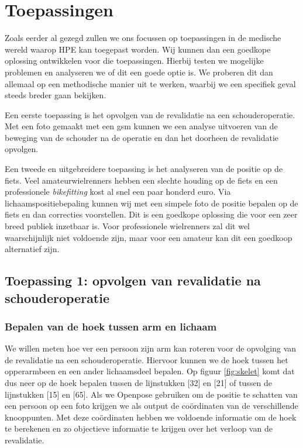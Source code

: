 \documentclass[a4paper,twoside,kulak]{kulakreport}
\begin{document}
\chapter{Toepassingen}
Zoals eerder al gezegd zullen we ons focussen op toepassingen in de medische wereld waarop HPE kan toegepast worden. Wij kunnen dan een goedkope oplossing ontwikkelen voor die toepassingen. Hierbij testen we mogelijke problemen en analyseren we of dit  een goede optie is. We proberen dit dan allemaal op een methodische manier uit te werken, waarbij we een specifiek geval steeds breder gaan bekijken.

Een eerste toepassing is het opvolgen van de revalidatie na een schouderoperatie. Met een foto gemaakt met een gsm kunnen we een analyse uitvoeren van de beweging van de schouder na de operatie en dan het doorheen de revalidatie opvolgen.

Een tweede en uitgebreidere toepassing is het analyseren van de positie op de fiets. Veel amateurwielrenners hebben een slechte houding op de fiets en een professionele \emph{bikefitting} kost al snel een paar honderd euro. Via lichaamspositiebepaling kunnen wij met een simpele foto de positie bepalen op de fiets en dan correcties voorstellen. Dit is een goedkope oplossing die voor een zeer breed publiek inzetbaar is. Voor professionele wielrenners zal dit wel waarschijnlijk niet voldoende zijn, maar voor een amateur kan dit een goedkoop alternatief zijn.

\section{Toepassing 1: opvolgen van revalidatie na schouderoperatie}
\subsection{Bepalen van de hoek tussen arm en lichaam}

We willen meten hoe ver een persoon zijn arm kan roteren voor de opvolging van de revalidatie na een schouderoperatie. Hiervoor kunnen we de hoek tussen het opperarmbeen en een ander lichaamsdeel bepalen. Op figuur \ref{fig:skelet} komt dat dus neer op de hoek bepalen tussen de lijnstukken [32] en [21] of tussen de lijnstukken [15] en [65]. Als we Openpose gebruiken om de positie te schatten van een persoon op een foto krijgen we als output de coördinaten van de verschillende knooppunten. Met deze coördinaten hebben we voldoende informatie om de hoek te berekenen en zo objectieve informatie te krijgen over het verloop van de revalidatie.
\end{document}
